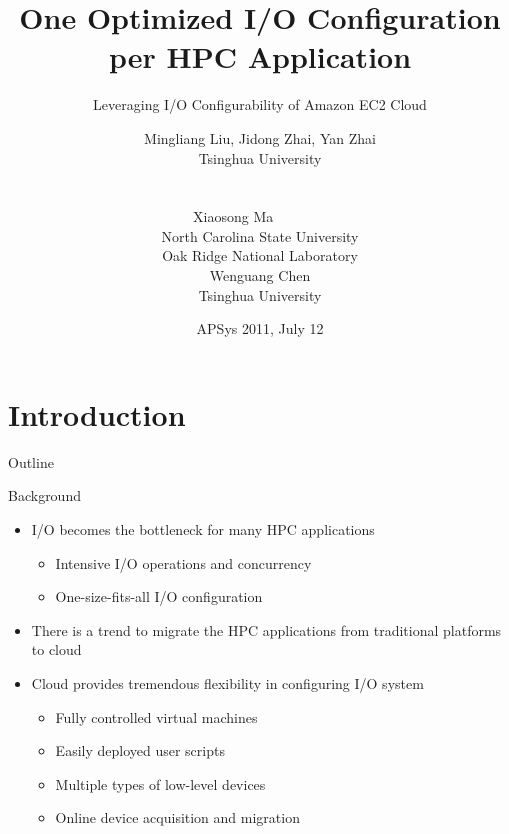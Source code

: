 \documentclass{beamer}
\begin{document}
\title{One Optimized I/O Configuration per HPC Application}
\subtitle{Leveraging I/O Configurability of Amazon EC2 Cloud}
\author{
    \parbox[t]{5.5cm}{
        \hfill Mingliang Liu, Jidong Zhai, Yan Zhai \hfill
        \\\hbox{}
        \hfill{\tiny Tsinghua University}\hfill\hbox{}
    }\\
    \vspace{.5cm}
    \parbox[t]{3.5cm}{
        \hfill Xiaosong Ma~ ~ ~ ~ ~ \hfill
        \\\hbox{}
        \hfill {\tiny {North Carolina State University}}\hfill \hbox{}
        \\\hbox{}
        \hfill {\tiny Oak Ridge National Laboratory}\hfill \hbox{}
    }
    \parbox[t]{2.5cm}{
        \hfill Wenguang Chen \hfill
        \\\hbox{}
        \hfill {\tiny {Tsinghua University}}\hfill \hbox{}
    }
}
\date{APSys 2011, July 12}

\begin{frame}
    \titlepage
\end{frame}

\section{Introduction}
\begin{frame}{Outline}
    \tableofcontents[current]
\end{frame}

\begin{frame}{Background}
    \begin{itemize}
        \item I/O becomes the bottleneck for many HPC applications
            \begin{itemize}
                \item Intensive I/O operations and concurrency
                \item One-size-fits-all I/O configuration
            \end{itemize}
        \item There is a trend to migrate the HPC applications from traditional
            platforms to cloud
        \item Cloud provides tremendous flexibility in configuring I/O system
            \begin{itemize}
                \item Fully controlled virtual machines
                \item Easily deployed user scripts
                \item Multiple types of low-level devices
                \item Online device acquisition and migration
            \end{itemize}
    \end{itemize}
\end{frame}
\end{document}
